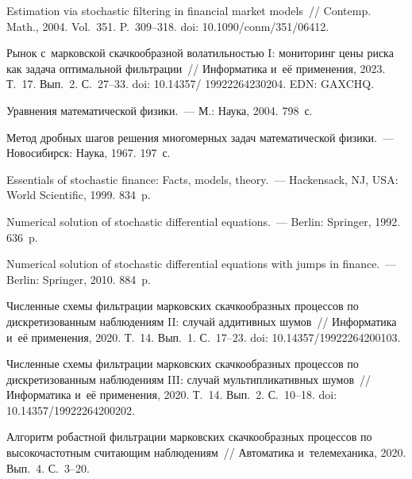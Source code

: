 \begin{multicols}{2}
\vspace*{-12pt}


{\small\frenchspacing
 {\baselineskip=10.6pt
 \begin{thebibliography}{99}
   

 Estimation via stochastic filtering in financial market models~// Contemp. Math., 2004. Vol.~351.  P.~309--318.
doi: 10.1090/conm/351/06412.

Рынок с~марковской скачкообразной во\-ла\-тиль\-ностью I: мониторинг цены риска как задача оптимальной 
фильт\-ра\-ции~// Информатика и~её применения, 2023. Т.~17. Вып.~2. 
С.~27--33. doi:  10.14357/ 19922264230204. EDN: GAXCHQ.

 Уравнения математической физики.~--- М.: Наука, 2004. 798~с.

 Метод дроб\-ных шагов решения многомерных задач математической физики.~--- Новосибирск: Наука, 1967. 197~с.

 Essentials of stochastic finance: Facts, models, theory.~--- Hackensack, NJ, USA: World Scientific, 1999. 834~p.

 Numerical solution of stochastic differential equations.~--- Berlin: Springer, 1992. 636~p.

 Numerical solution of stochastic differential equations with jumps in finance.~--- Berlin: Springer, 2010. 884~p.

 Численные схемы фильт\-ра\-ции марковских скачкообразных процессов по дискретизованным наблюдениям II: случай ад\-ди\-тив\-ных шумов~//
 Информатика и~её применения, 2020. Т.~14. Вып.~1. С.~17--23. doi: 10.14357/19922264200103.

 Чис\-лен\-ные схемы фильт\-ра\-ции марковских скачкообразных процессов 
по дискретизованным наблюдениям III: случай муль\-ти\-пли\-ка\-тив\-ных шумов~//
 Информатика и~её применения, 2020. Т.~14. Вып.~2. С.~10--18. doi: 10.14357/19922264200202.

 Алгоритм робастной фильт\-ра\-ции марковских скачкообразных процессов по вы\-со\-ко\-час\-тот\-ным счи\-та\-ющим наблюдениям~// 
Автоматика и~телемеханика, 2020. Вып.~4. С.~3--20.
\end{thebibliography}

 }
 }

\end{multicols}

